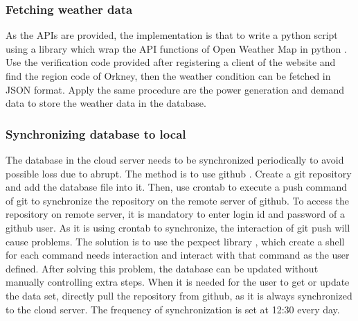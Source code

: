\documentclass[12pt,a4paper]{report}
\begin{document}
                \subsubsection{Fetching weather data}
                As the APIs are provided, the implementation is that to write a python script using a library which wrap the API functions of Open Weather Map in python \cite{website:pyowm}.
                Use the verification code provided after registering a client of the website and find the region code of Orkney, then the weather condition can be fetched in JSON format. Apply
                the same procedure are the power generation and demand data to store the weather data in the database.

                \subsubsection{Synchronizing database to local} 
                The database in the cloud server needs to be synchronized periodically to avoid possible loss due to abrupt. The method is to use github \cite{website:github}. Create a git repository \cite{website:git}
                and add the database file into it. Then, use crontab to execute a push command of git to synchronize the repository on the remote server of github. To access the repository on remote server, it is mandatory
                to enter login id and password of a github user. As it is using crontab to synchronize, the interaction of git push will cause problems. The solution is to use the pexpect library \cite{website:pexpect}, which
                create a shell for each command needs interaction and interact with that command as the user defined. After solving this problem, the database can be updated without manually controlling extra steps. When it is
                needed for the user to get or update the data set, directly pull the repository from github, as it is always synchronized to the cloud server. The frequency of synchronization is set at 12:30 every day.
\end{document}
